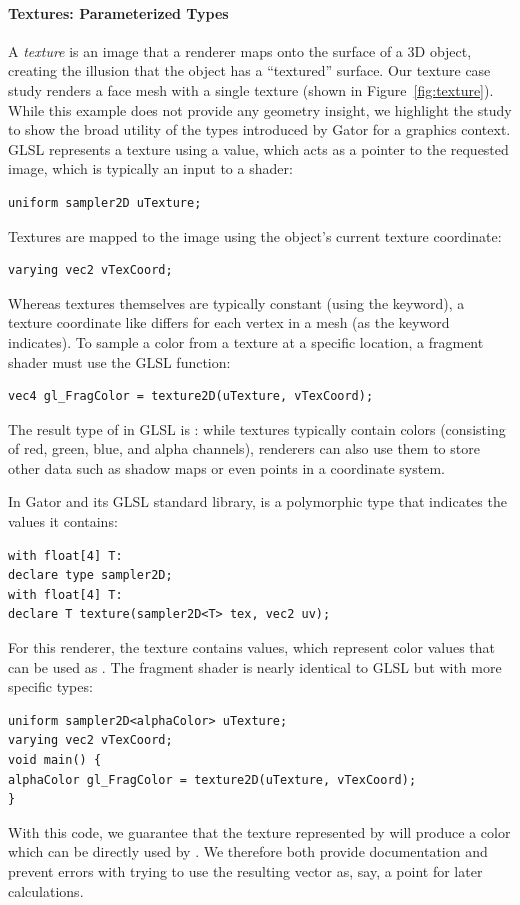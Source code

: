 \documentclass[../main.tex]{subfiles}
\begin{document}
{\paragraph{Textures: Parameterized Types}
A \emph{texture} is an image that a renderer maps onto the surface of a 3D object, creating the illusion that the object has a ``textured'' surface.
Our texture case study renders a face mesh with a single texture (shown in Figure~\ref{fig:texture}).
While this example does not provide any geometry insight, we highlight the study to show the broad utility of the types introduced by Gator for a graphics context.
GLSL represents a texture using a  value, which acts as a pointer to the requested image, which is typically an input to a shader:
%
\begin{lstlisting}
uniform sampler2D uTexture;
\end{lstlisting}
%
Textures are mapped to the image using the object's current texture coordinate:
%
\begin{lstlisting}
varying vec2 vTexCoord;
\end{lstlisting}
%
Whereas textures themselves are typically constant (using the  keyword), a texture coordinate like  differs for each vertex in a mesh (as the  keyword indicates).
To sample a color from a texture at a specific location, a fragment shader must use the GLSL  function:
%
\begin{lstlisting}
vec4 gl_FragColor = texture2D(uTexture, vTexCoord);
\end{lstlisting}
%
The result type of  in GLSL is : while textures typically contain colors (consisting of red, green, blue, and alpha channels), renderers can also use them to store other data such as shadow maps or even points in a coordinate system.

In Gator and its GLSL standard library,  is a polymorphic type that indicates the values it contains:
\begin{lstlisting}
with float[4] T:
declare type sampler2D;
with float[4] T:
declare T texture(sampler2D<T> tex, vec2 uv);
\end{lstlisting}
For this renderer, the texture contains  values, which represent color values that can be used as .
The fragment shader is nearly identical to GLSL but with more specific types:
%
\begin{lstlisting}
uniform sampler2D<alphaColor> uTexture;
varying vec2 vTexCoord;
void main() {
alphaColor gl_FragColor = texture2D(uTexture, vTexCoord);
}
\end{lstlisting}
%
With this code, we guarantee that the texture represented by  will produce a color which can be directly used by .  We therefore both provide documentation and prevent errors with trying to use the resulting vector as, say, a point for later calculations.

}
\end{document}
